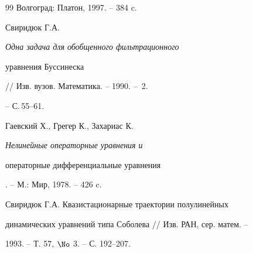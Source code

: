 \begin{thebibliography}{99}
Волгоград: Платон, 1997. -- 384 c.




Свиридюк Г.А. {\em Одна задача для обобщенного фильтрационного


уравнения Буссинеска} // Изв. вузов. Математика. -- 1990. -- \No\,2.


-- С.\,55--61.




Гаевский Х., Грегер К., Захариас К. {\em Нелинейные операторные уравнения и


операторные дифференциальные уравнения}. -- М.: Мир, 1978. -- 426 c.





\end{thebibliography}





\vskip 2cm












\label{end}










Свиридюк Г.А. Квазистационарные траектории полулинейных


динамических уравнений типа Соболева // Изв. РАН, сер. матем. --


1993. -- Т. 57, $\No$ 3. -- С. 192--207.


